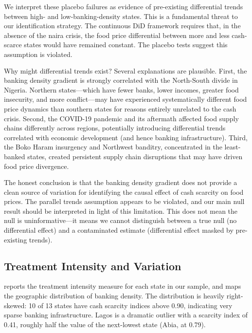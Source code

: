 \documentclass[12pt]{article}
\begin{document}
We interpret these placebo failures as evidence of pre-existing differential trends between high- and low-banking-density states. This is a fundamental threat to our identification strategy. The continuous DiD framework requires that, in the absence of the naira crisis, the food price differential between more and less cash-scarce states would have remained constant. The placebo tests suggest this assumption is violated.

Why might differential trends exist? Several explanations are plausible. First, the banking density gradient is strongly correlated with the North-South divide in Nigeria. Northern states---which have fewer banks, lower incomes, greater food insecurity, and more conflict---may have experienced systematically different food price dynamics than southern states for reasons entirely unrelated to the cash crisis. Second, the COVID-19 pandemic and its aftermath affected food supply chains differently across regions, potentially introducing differential trends correlated with economic development (and hence banking infrastructure). Third, the Boko Haram insurgency and Northwest banditry, concentrated in the least-banked states, created persistent supply chain disruptions that may have driven food price divergence.

The honest conclusion is that the banking density gradient does not provide a clean source of variation for identifying the causal effect of cash scarcity on food prices. The parallel trends assumption appears to be violated, and our main null result should be interpreted in light of this limitation. This does not mean the null is uninformative---it means we cannot distinguish between a true null (no differential effect) and a contaminated estimate (differential effect masked by pre-existing trends).

\subsection{Treatment Intensity and Variation}

 reports the treatment intensity measure for each state in our sample, and  maps the geographic distribution of banking density. The distribution is heavily right-skewed: 10 of 13 states have cash scarcity indices above 0.90, indicating very sparse banking infrastructure. Lagos is a dramatic outlier with a scarcity index of 0.41, roughly half the value of the next-lowest state (Abia, at 0.79).
\end{document}
